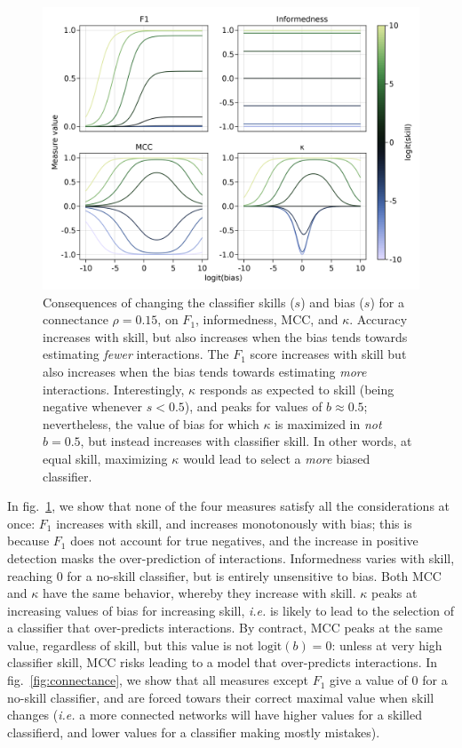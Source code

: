 \documentclass[10pt,oneside]{article}
\makeatletter
\def\maxwidth{\ifdim\Gin@nat@width>\linewidth\linewidth
\else\Gin@nat@width\fi}
\let\Oldincludegraphics\includegraphics
\renewcommand{\includegraphics}[1]{\Oldincludegraphics[width=\maxwidth]{#1}}
\makeatother
\begin{document}
\begin{figure}
\hypertarget{fig:bias}{%
\centering
\includegraphics{figures/changing-bias.png}
\caption{Consequences of changing the classifier skills (\(s\)) and bias
(\(s\)) for a connectance \(\rho=0.15\), on \(F_1\), informedness, MCC,
and \(\kappa\). Accuracy increases with skill, but also increases when
the bias tends towards estimating \emph{fewer} interactions. The \(F_1\)
score increases with skill but also increases when the bias tends
towards estimating \emph{more} interactions. Interestingly, \(\kappa\)
responds as expected to skill (being negative whenever \(s < 0.5\)), and
peaks for values of \(b \approx 0.5\); nevertheless, the value of bias
for which \(\kappa\) is maximized in \emph{not} \(b=0.5\), but instead
increases with classifier skill. In other words, at equal skill,
maximizing \(\kappa\) would lead to select a \emph{more} biased
classifier.}\label{fig:bias}
}
\end{figure}

In fig.~\ref{fig:bias}, we show that none of the four measures satisfy
all the considerations at once: \(F_1\) increases with skill, and
increases monotonously with bias; this is because \(F_1\) does not
account for true negatives, and the increase in positive detection masks
the over-prediction of interactions. Informedness varies with skill,
reaching 0 for a no-skill classifier, but is entirely unsensitive to
bias. Both MCC and \(\kappa\) have the same behavior, whereby they
increase with skill. \(\kappa\) peaks at increasing values of bias for
increasing skill, \emph{i.e.} is likely to lead to the selection of a
classifier that over-predicts interactions. By contract, MCC peaks at
the same value, regardless of skill, but this value is not
\(\text{logit}(b)=0\): unless at very high classifier skill, MCC risks
leading to a model that over-predicts interactions. In
fig.~\ref{fig:connectance}, we show that all measures except \(F_1\)
give a value of 0 for a no-skill classifier, and are forced towars their
correct maximal value when skill changes (\emph{i.e.} a more connected
networks will have higher values for a skilled classifierd, and lower
values for a classifier making mostly mistakes).
\end{document}
